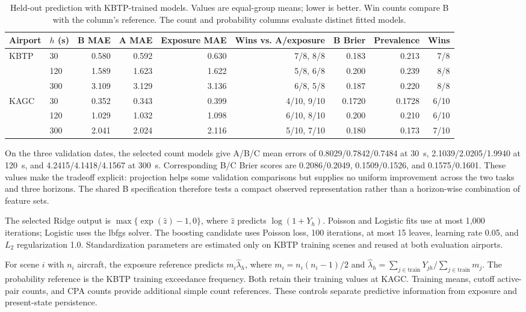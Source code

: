 \documentclass[10pt,journal,letterpaper]{IEEEtran}
\begin{document}
\begin{table}[!t]
\caption{Held-out prediction with KBTP-trained models. Values are equal-group means; lower is better. Win counts compare B with the column's reference. The count and probability columns evaluate distinct fitted models.}
\label{tab:results}
\centering
\setlength{\tabcolsep}{4pt}
\begin{tabular}{llrrrrrrr}
\toprule
Airport & $h$ (s) & B MAE & A MAE & Exposure MAE & Wins vs. A/exposure & B Brier & Prevalence & Wins \\
\midrule
KBTP & 30 & 0.580 & 0.592 & 0.630 & 7/8, 8/8 & 0.183 & 0.213 & 7/8 \\
 & 120 & 1.589 & 1.623 & 1.622 & 5/8, 6/8 & 0.200 & 0.239 & 8/8 \\
 & 300 & 3.109 & 3.129 & 3.136 & 6/8, 5/8 & 0.187 & 0.220 & 8/8 \\
\midrule
KAGC & 30 & 0.352 & 0.343 & 0.399 & 4/10, 9/10 & 0.1720 & 0.1728 & 6/10 \\
 & 120 & 1.029 & 1.032 & 1.098 & 6/10, 8/10 & 0.200 & 0.210 & 6/10 \\
 & 300 & 2.041 & 2.024 & 2.116 & 5/10, 7/10 & 0.180 & 0.173 & 7/10 \\
\bottomrule
\end{tabular}
\end{table}

On the three validation dates, the selected count models give A/B/C mean errors of 0.8029/0.7842/0.7484 at 30~s, 2.1039/2.0205/1.9940 at 120~s, and 4.2415/4.1418/4.1567 at 300~s. Corresponding B/C Brier scores are 0.2086/0.2049, 0.1509/0.1526, and 0.1575/0.1601. These values make the tradeoff explicit: projection helps some validation comparisons but supplies no uniform improvement across the two tasks and three horizons. The shared B specification therefore tests a compact observed representation rather than a horizon-wise combination of feature sets.

The selected Ridge output is $\max\{\exp(\widehat z)-1,0\}$, where $\widehat z$ predicts $\log(1+Y_h)$. Poisson and Logistic fits use at most 1,000 iterations; Logistic uses the lbfgs solver. The boosting candidate uses Poisson loss, 100 iterations, at most 15 leaves, learning rate 0.05, and $L_2$ regularization 1.0. Standardization parameters are estimated only on KBTP training scenes and reused at both evaluation airports.

For scene $i$ with $n_i$ aircraft, the exposure reference predicts $m_i\widehat\lambda_h$, where $m_i=n_i(n_i-1)/2$ and $\widehat\lambda_h=\sum_{j\in\mathrm{train}}Y_{jh}/\sum_{j\in\mathrm{train}}m_j$. The probability reference is the KBTP training exceedance frequency. Both retain their training values at KAGC. Training means, cutoff active-pair counts, and CPA counts provide additional simple count references. These controls separate predictive information from exposure and present-state persistence.
\end{document}
